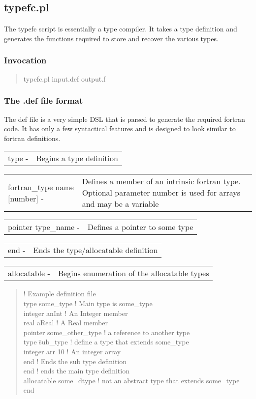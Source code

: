 \documentclass{article}
\begin{document}
\subsection{typefc.pl}
\label{sec.typefc}
\paragraph{}
The typefc script is essentially a type compiler. It takes a type definition and generates the functions required to store and recover the various types.
\subsubsection{Invocation}
\begin{quote}
   typefc.pl input.def output.f
\end{quote}
\subsubsection{The .def file format}
\newcommand{\syn}[2]{
   \begin{tabular}{lp{0.7\textwidth}}
      #1 - & #2
   \end{tabular}
}
The def file is a very simple DSL that is parsed to generate the required fortran code. It has only a few syntactical features and is designed to look similar to fortran definitions.
\begin{list}{}{}
\item \syn {type}{Begins a type definition}
\item \syn{fortran\_type name [number]}{Defines a member of an intrinsic fortran type. Optional parameter number is used for arrays and may be a variable}
\item \syn{pointer type\_name}{Defines a pointer to some type}
\item \syn{end}{Ends the type/allocatable definition}
\item \syn{allocatable}{Begins enumeration of the allocatable types}
\end{list}
\begin{quote}
   \begin{tabbing}
! Example definition file \\
type \= some\_type ! Main type is some\_type \\
\> integer anInt ! An Integer member \\
\> real aReal ! A Real member \\
\> pointer some\_other\_type ! a reference to another type \\
\> type \= sub\_type ! define a type that extends some\_type \\
\> \> integer arr 10 ! An integer array \\
\> end ! Ends the sub type definition\\
end ! ends the main type definition\\
allocatable
\> some\_dtype ! not an abstract type that extends some\_type
end
\end{tabbing}
\end{quote}
\end{document}
